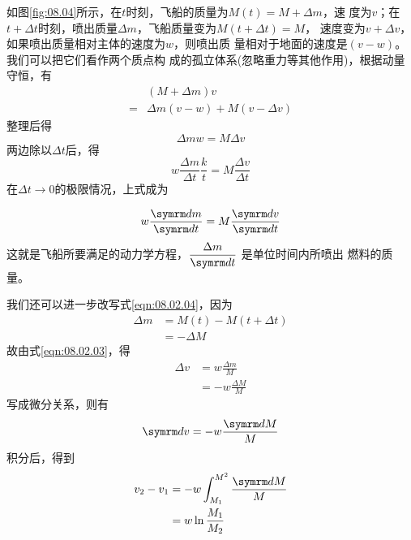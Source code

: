 如图\ref{fig:08.04}所示，在$ t $时刻，飞船的质量为$  M \left( t \right) = M + \Delta m $，速
度为$ v $；在$ t + \Delta t $时刻，喷出质量$ \Delta m $，飞船质量变为$ M \left( t + \Delta t \right) = M $，
速度变为$ v + \Delta v $，如果喷出质量相对主体的速度为$ w $，则喷出质
量相对于地面的速度是$ \left( v - w \right) $。我们可以把它们看作两个质点构
成的孤立体系(忽略重力等其他作用)，根据动量守恒，有
\begin{equation*}
  \begin{split}
    & \left( M + \Delta m \right) v \\
    = & \Delta m \left( v - w \right) + M \left( v - \Delta v \right)
  \end{split}
\end{equation*}
整理后得\vspace{-1.56em}
\begin{equation}\label{eqn:08.02.03}
  \Delta m w = M \Delta v
\end{equation}
两边除以$ \Delta t $后，得
\begin{equation*}
  w \frac { \Delta m } { \Delta t } \frac { k } { t } = M \frac { \Delta v } { \Delta t }
\end{equation*}
在$ \Delta t \to 0 $的极限情况，上式成为

\mbox{}\vspace{-1.5em}
\begin{equation}\label{eqn:08.02.04}
  w \frac { \dif m } { \dif t } = M \frac { \dif v } { \dif t }
\end{equation}
这就是飞船所要满足的动力学方程，$ \dfrac { \Delta m } { \dif t } $
是单位时间内所喷出
燃料的质量。

我们还可以进一步改写式\eqref{eqn:08.02.04}，因为
\begin{equation*}
  \begin{split}
    \Delta m & = M \left( t \right) - M \left( t + \Delta t \right) \\
    & = - \Delta M
  \end{split}
\end{equation*}
故由式\eqref{eqn:08.02.03}，得
\begin{equation*}
  \begin{split}
    \Delta v &= w \frac { \Delta m } { M } \\
    & = - w \frac { \Delta M } { M }
  \end{split}
\end{equation*}
写成微分关系，则有
\begin{equation*}
  \dif v = - w \frac { \dif M } { M }
\end{equation*}
积分后，得到
\begin{equation*}
  \begin{split}
    v _ { 2 } - v _ { 1 } & = - w \int _ { M _ { 1 } } ^ { M ^ { 2 } } \frac { \dif M } { M } \\
    & = w \ln \frac { M _ { 1 } } { M _ { 2 } }
  \end{split}
\end{equation*}

